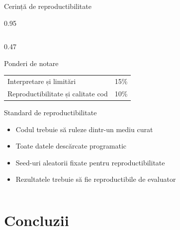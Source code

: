 \documentclass[9pt, aspectratio=169, t]{beamer}
\begin{document}
\begin{frame}{Cerință de reproductibilitate}
\begin{cminipage}{0.95\textwidth}
{\begin{columns}[T]
\begin{column}{0.47\textwidth}
\begin{alertblock}{Ponderi de notare}
{\begin{center}
\begin{tabular}{lr}
                        Interpretare și limitări & 15\% \\
                        Reproductibilitate și calitate cod & 10\% \\
                        \bottomrule
                    \end{tabular}
                \end{center}
                }
            \end{alertblock}
            \vspace{-2mm}
            \begin{exampleblock}{Standard de reproductibilitate}
                \begin{itemize}\setlength{\itemsep}{0pt}
                    \item Codul trebuie să ruleze dintr-un mediu curat
                    \item Toate datele descărcate programatic
                    \item Seed-uri aleatorii fixate pentru reproductibilitate
                    \item Rezultatele trebuie să fie reproductibile de evaluator
                \end{itemize}
            \end{exampleblock}
        \end{column}
    \end{columns}
    }
    \end{cminipage}
\end{frame}

\section{Concluzii}
\end{document}
